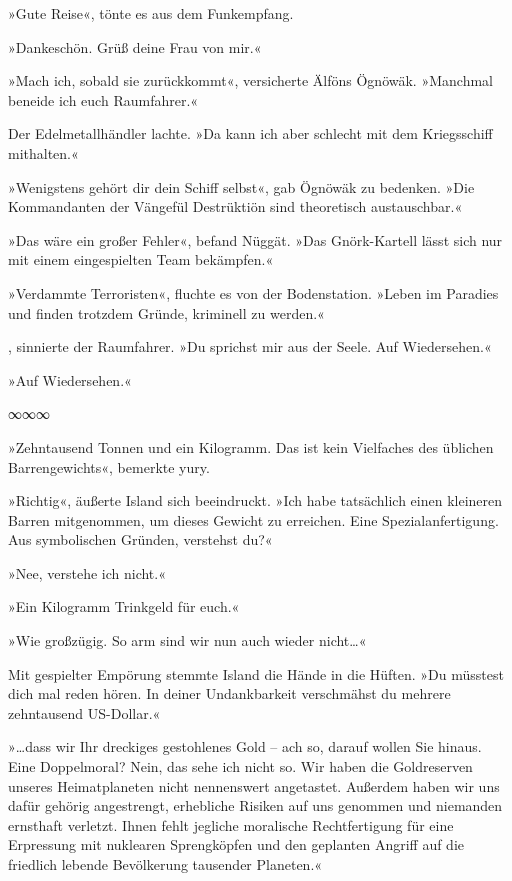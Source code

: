 »Gute Reise«, tönte es aus dem Funkempfang.

»Dankeschön. Grüß deine Frau von mir.«

»Mach ich, sobald sie zurückkommt«, versicherte Älföns Ögnöwäk. »Manchmal beneide ich euch Raumfahrer.«

Der Edelmetallhändler lachte. »Da kann ich aber schlecht mit dem Kriegsschiff mithalten.«

»Wenigstens gehört dir dein Schiff selbst«, gab Ögnöwäk zu bedenken. »Die Kommandanten der Vängefül Destrüktiön sind theoretisch austauschbar.«

»Das wäre ein großer Fehler«, befand Nüggät. »Das Gnörk-Kartell lässt sich nur mit einem eingespielten Team bekämpfen.«

»Verdammte Terroristen«, fluchte es von der Bodenstation. »Leben im Paradies und finden trotzdem Gründe, kriminell zu werden.«

, sinnierte der Raumfahrer. »Du sprichst mir aus der Seele. Auf Wiedersehen.« 

»Auf Wiedersehen.«

\begin{center}
∞∞∞
\end{center}

»Zehntausend Tonnen und ein Kilogramm. Das ist kein Vielfaches des üblichen Barrengewichts«, bemerkte yury.

»Richtig«, äußerte Island sich beeindruckt. »Ich habe tatsächlich einen kleineren Barren mitgenommen, um dieses Gewicht zu erreichen. Eine Spezialanfertigung. Aus symbolischen Gründen, verstehst du?«

»Nee, verstehe ich nicht.«

»Ein Kilogramm Trinkgeld für euch.«

»Wie großzügig. So arm sind wir nun auch wieder nicht…«

Mit gespielter Empörung stemmte Island die Hände in die Hüften. »Du müsstest dich mal reden hören. In deiner Undankbarkeit verschmähst du mehrere zehntausend US-Dollar.«

»…dass wir Ihr dreckiges gestohlenes Gold – ach so, darauf wollen Sie hinaus. Eine Doppelmoral? Nein, das sehe ich nicht so. Wir haben die Goldreserven unseres Heimatplaneten nicht nennenswert angetastet. Außerdem haben wir uns dafür gehörig angestrengt, erhebliche Risiken auf uns genommen und niemanden ernsthaft verletzt. Ihnen fehlt jegliche moralische Rechtfertigung für eine Erpressung mit nuklearen Sprengköpfen und den geplanten Angriff auf die friedlich lebende Bevölkerung tausender Planeten.«

